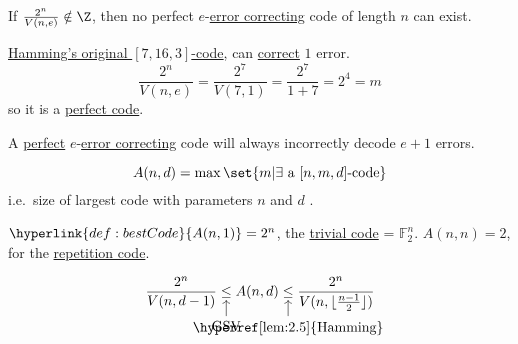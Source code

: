 \documentclass{article}
\DeclarePairedDelimiter{\floor}{\lfloor}{\rfloor}
\newcommand{\1}[1]{\mathbbm{1}_{#1}}
\begin{document}
\begin{remark}
    If $\frac{2^n}{V(n, e)} \notin \Z$, then no perfect $e$-\hyperlink{def:errorCor}{error correcting} code of length $n$ can exist.
\end{remark}
\begin{eg}
    \hyperlink{def:hammingCode}{Hamming's original $[7,16,3]$-code}, can \hyperlink{def:errorCor}{correct} $1$ error.
    \begin{equation*}
        \frac{2^n}{V(n, e)} = \frac{2^7}{V(7, 1)} = \frac{2^7}{1 + 7} = 2^4 = m
    \end{equation*}
    so it is a \hyperlink{def:perfect}{perfect code}.
\end{eg}
\begin{remark}
    A \hyperlink{def:perfect}{perfect} $e$-\hyperlink{def:errorCor}{error correcting} code will always incorrectly decode $e+1$ errors.
\end{remark}
\begin{defi}
    \begin{equation*}
        A(n, d) = \max\set{m | \exists \text{ a } [n, m, d]\text{-code}}
    \end{equation*}
    i.e.\ size of largest code with parameters $n$ and $d$ .
\end{defi}
\begin{eg}
    $\hyperlink{def:bestCode}{A(n, 1)} = 2^n$, the \hyperlink{def:trivialCode}{trivial code} = $\mathbb{F}_2^n$. $A(n, n) = 2$, for the \hyperlink{def:repetitionCode}{repetition code}.
\end{eg}
\begin{nprop}\label{prop:2.6}
    \begin{equation*}
        \frac{2^n}{V(n, d-1)} \underset{\mathclap{
            \begin{tikzpicture}
                \node[below] (A) at (0, 0) {GSV};
                \draw[->] (A) to (0, 0.4);
            \end{tikzpicture}
        }}{\leq} A(n, d)
        \underset{\mathclap{
            \begin{tikzpicture}
                \node[below] (A) at (0, 0) {\hyperref[lem:2.5]{Hamming}};
                \draw[->] (A) to (0, 0.4);
            \end{tikzpicture}
        }}{\leq}
        \frac{2^n}{V(n, \floor{\frac{n-1}{2}})}
    \end{equation*}
\end{nprop}
\end{document}
